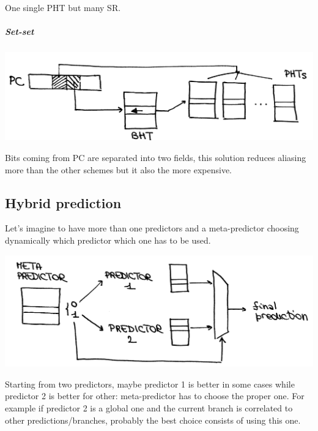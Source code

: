 One single PHT but many SR.
\subparagraph{Set-set}
\begin{center}
  \includegraphics[width=0.7\linewidth]{img/img3/23}
\end{center}
Bits coming from PC are separated into two fields, this solution reduces
aliasing more than the other schemes but it also the more expensive.
\newpage
\subsection{Hybrid prediction}
Let's imagine to have more than one predictors and a meta-predictor choosing
dynamically which predictor which one has to be used.
\begin{center}
  \includegraphics[width=0.7\linewidth]{img/img3/24}
\end{center}
Starting from two predictors, maybe predictor 1 is better in some cases while
predictor 2 is better for other: meta-predictor has to choose the proper one.
For example if predictor 2 is a global one and the current branch is correlated
to other predictions/branches, probably the best choice consists of using this
one.
